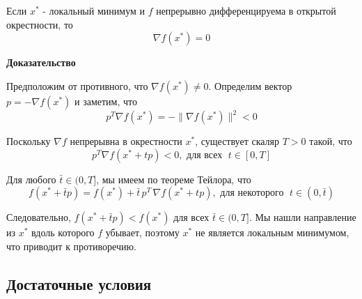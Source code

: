 \documentclass[
  russian,
  letterpaper,
  DIV=11,
  numbers=noendperiod]{scrartcl}
\begin{document}
\begin{tcolorbox}[enhanced jigsaw, opacityback=0, coltitle=black, left=2mm, colframe=quarto-callout-color-frame, rightrule=.15mm, titlerule=0mm, leftrule=.75mm, breakable, colback=white, bottomrule=.15mm, bottomtitle=1mm, toptitle=1mm, opacitybacktitle=0.6, title=\textcolor{quarto-callout-color}{\faInfo}\hspace{0.5em}{Необходимое условие оптимальности первого порядка}, colbacktitle=quarto-callout-color!10!white, arc=.35mm, toprule=.15mm]

Если \(x^*\) - локальный минимум и \(f\) непрерывно дифференцируема в
открытой окрестности, то \[
\nabla f(x^*) = 0
\]

\textbf{Доказательство}

Предположим от противного, что \(\nabla f(x^*) \neq 0\). Определим
вектор \(p = -\nabla f(x^*)\) и заметим, что \[
p^T \nabla f(x^*) = -\| \nabla f(x^*) \|^2 < 0
\]

Поскольку \(\nabla f\) непрерывна в окрестности \(x^*\), существует
скаляр \(T > 0\) такой, что \[
p^T \nabla f(x^* + tp) < 0, \text{ для всех }\; t \in [0,T]
\]

Для любого \(\bar{t} \in (0, T]\), мы имеем по теореме Тейлора, что \[
f(x^* + \bar{t}p) = f(x^*) + \bar{t}\, p^T \, \nabla f(x^* + tp), \text{ для некоторого }\; t \in (0,\bar{t})
\]

Следовательно, \(f(x^* + \bar{t}p) < f(x^*)\) для всех
\(\bar{t} \in (0, T]\). Мы нашли направление из \(x^*\) вдоль которого
\(f\) убывает, поэтому \(x^*\) не является локальным минимумом, что
приводит к противоречию.

\end{tcolorbox}

\subsection{Достаточные
условия}\label{ux434ux43eux441ux442ux430ux442ux43eux447ux43dux44bux435-ux443ux441ux43bux43eux432ux438ux44f}
\end{document}
